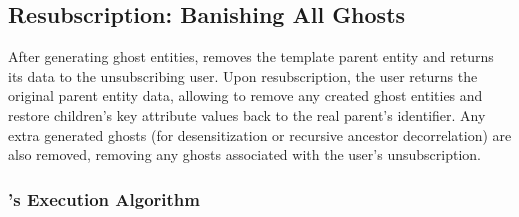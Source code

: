 \subsection{Resubscription: Banishing All Ghosts}
After generating ghost entities, \sys removes the template parent entity and returns its data to the
unsubscribing user. Upon resubscription, the user returns the original parent entity data, allowing
\sys to remove any created ghost entities and restore children's key attribute values back to the
real parent's identifier.
Any extra generated ghosts (for desensitization or recursive ancestor decorrelation) are also
removed, removing any ghosts associated with the user's unsubscription.

        
\subsubsection{\sys's Execution Algorithm}


